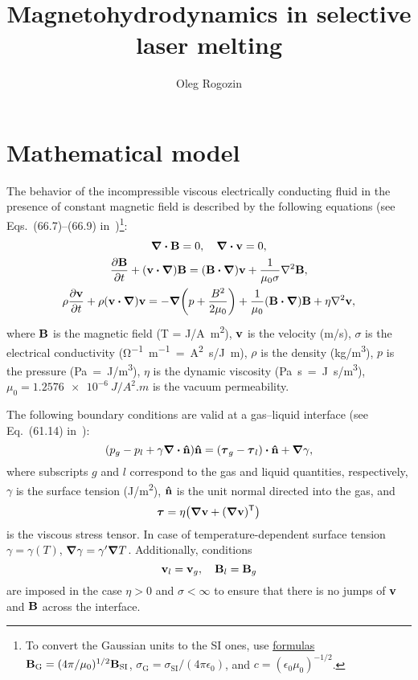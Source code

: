\documentclass{article}
\title{Magnetohydrodynamics in selective laser melting}
\author{Oleg Rogozin}
\newcommand{\tran}{\mathsf{T}}
\newcommand{\bv}{\vb{v}}
\newcommand{\bn}{\vu{n}}
\newcommand{\bB}{\vb{B}}
\begin{document}
\maketitle
\tableofcontents

\section{Mathematical model}

The behavior of the incompressible viscous electrically conducting fluid
in the presence of constant magnetic field is described by the following equations
(see Eqs.~(66.7)--(66.9) in~\cite{Landavshits8})\footnote{
    To convert the Gaussian units to the SI ones, use
    \href{https://en.wikipedia.org/wiki/Gaussian_units\#Electromagnetic_unit_names}{formulas}
    $\bB_\text{G} = (4\pi/\mu_0)^{1/2}\bB_\text{SI}$,
    $\sigma_\text{G} = \sigma_\text{SI}/(4\pi\epsilon_0)$,
    and $c = (\epsilon_0\mu_0)^{-1/2}$.
}:
\begin{gather}
    \div\bB = 0, \quad \div\bv = 0, \label{eq:continuity}\\
    \pdv{\bB}{t} + (\bv\vdot\grad)\bB = (\bB\vdot\grad)\bv + \frac1{\mu_0\sigma}\laplacian\bB, \label{eq:B}\\
    \rho\pdv{\bv}{t} + \rho(\bv\vdot\grad)\bv = -\grad(p+\frac{B^2}{2\mu_0})
        + \frac1{\mu_0}(\bB\vdot\grad)\bB + \eta\laplacian\bv, \label{eq:momentum}
\end{gather}
where $\bB$ is the magnetic field (\si{\tesla} = \si{J/A.m^2}),
$\bv$ is the velocity (\si{m/s}),
$\sigma$ is the electrical conductivity (\si{\ohm^{-1}.m^{-1} = A^2.s/J.m}),
$\rho$ is the density (\si{kg/m^3}), $p$ is the pressure (\si{Pa = J/m^3}),
$\eta$ is the dynamic viscosity (\si{Pa.s = J.s/m^3}),
$\mu_0 = \SI{1.2576e-6}{J/A^2.m}$ is the vacuum permeability.

The following boundary conditions are valid at a gas--liquid interface (see Eq.~(61.14) in~\cite{Landavshits6}):
\begin{equation}\label{eq:bc1}
    \qty(p_g - p_l + \gamma\div\bn)\bn = \qty(\vb*\tau_g - \vb*\tau_l)\vdot\bn + \grad\gamma,
\end{equation}
where subscripts $g$ and $l$ correspond to the gas and liquid quantities, respectively,
$\gamma$ is the surface tension (\si{J/m^2}), $\bn$ is the unit normal directed into the gas,
and
\begin{equation}\label{eq:tau}
    \vb*\tau = \eta\qty(\grad\bv + (\grad\bv)^\tran)
\end{equation}
is the viscous stress tensor.
In case of temperature-dependent surface tension $\gamma=\gamma(T)$, $\grad\gamma = \gamma'\grad{T}$.
Additionally, conditions
\begin{equation}\label{eq:bc2}
    \bv_l = \bv_g, \quad \bB_l = \bB_g
\end{equation}
are imposed in the case $\eta>0$ and $\sigma<\infty$ to ensure that
there is no jumps of $\bv$ and $\bB$ across the interface.
\end{document}
